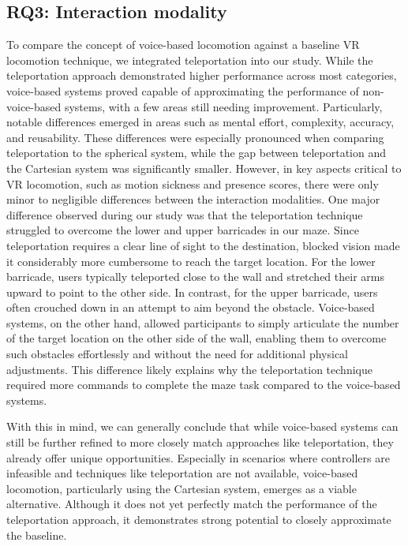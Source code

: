 \documentclass[preprint,12pt]{elsarticle}
\newcommand{\reftext}[1]{{\color{gray}#1}}   %
\begin{document}
\subsection{RQ3: Interaction modality}
\reftext{To compare the concept of voice-based locomotion against a baseline VR locomotion technique, we integrated teleportation into our study. While the teleportation approach demonstrated higher performance across most categories, voice-based systems proved capable of approximating the performance of non-voice-based systems, with a few areas still needing improvement. Particularly, notable differences emerged in areas such as mental effort, complexity, accuracy, and reusability. These differences were especially pronounced when comparing teleportation to the spherical system, while the gap between teleportation and the Cartesian system was significantly smaller. However, in key aspects critical to VR locomotion, such as motion sickness and presence scores, there were only minor to negligible differences between the interaction modalities. One major difference observed during our study was that the teleportation technique struggled to overcome the lower and upper barricades in our maze. Since teleportation requires a clear line of sight to the destination, blocked vision made it considerably more cumbersome to reach the target location. For the lower barricade, users typically teleported close to the wall and stretched their arms upward to point to the other side. In contrast, for the upper barricade, users often crouched down in an attempt to aim beyond the obstacle. Voice-based systems, on the other hand, allowed participants to simply articulate the number of the target location on the other side of the wall, enabling them to overcome such obstacles effortlessly and without the need for additional physical adjustments. This difference likely explains why the teleportation technique required more commands to complete the maze task compared to the voice-based systems.}

\reftext{With this in mind, we can generally conclude that while voice-based systems can still be further refined to more closely match approaches like teleportation, they already offer unique opportunities. Especially in scenarios where controllers are infeasible and techniques like teleportation are not available, voice-based locomotion, particularly using the Cartesian system, emerges as a viable alternative. Although it does not yet perfectly match the performance of the teleportation approach, it demonstrates strong potential to closely approximate the baseline.}
\end{document}
